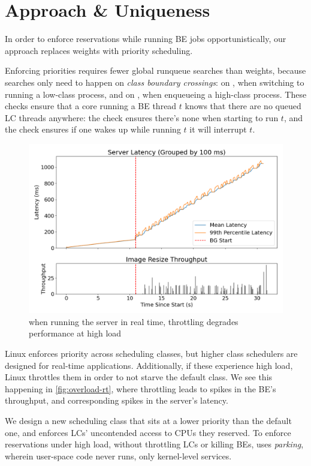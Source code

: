 \section{Approach \& Uniqueness}

In order to enforce reservations while running BE jobs opportunistically, our
approach replaces weights with priority scheduling.

Enforcing priorities requires fewer global runqueue searches than weights,
because searches only need to happen on \textit{class boundary crossings}: on
\exit{}, when switching to running a low-class process, and on \entry{}, when
enqueueing a high-class process. These checks ensure that a core running a BE
thread $t$ knows that there are no queued LC threads anywhere: the \exit{} check
ensures there's none when starting to run $t$, and the \entry{} check ensures if
one wakes up while running $t$ it will interrupt $t$.

\begin{figure}[t]
    \centering
    \includegraphics[width=\columnwidth]{graphs/overload-rt.png}
    \caption{when running the server in real time, throttling degrades
    performance at high load}\label{fig:overload-rt}
\end{figure}


Linux enforces priority across scheduling classes, but higher class schedulers
are designed for real-time applications. Additionally, if these experience high
load, Linux throttles them in order to not starve the default class. We see this
happening in \autoref{fig:overload-rt}, where throttling leads to spikes in the
BE's throughput, and corresponding spikes in the server's latency.

We design a new scheduling class \beclass{} that sits at a lower priority than
the default one, and enforces LCs' uncontended access to CPUs they reserved. To
enforce reservations under high load, without throttling LCs or killing BEs,
\beclass{} uses \textit{parking}, wherein user-space code never runs, only
kernel-level services.